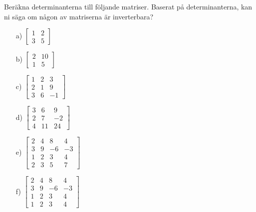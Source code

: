Beräkna determinanterna till följande matriser. Baserat på determinanterna, kan ni säga om någon av matriserna är inverterbara?
\begin{itemize}
	\item[a) ] $\begin{bmatrix}1 & 2 \\ 3 & 5\end{bmatrix}$
	\item[b) ] $\begin{bmatrix}2 & 10 \\ 1 & 5\end{bmatrix}$
	\item[c) ] $\begin{bmatrix}1 & 2 & 3\\ 2 & 1 & 9 \\ 3 & 6 & -1\end{bmatrix}$
	\item[d) ] $\begin{bmatrix}3 & 6 & 9\\ 2 & 7 & -2 \\ 4 & 11 & 24\end{bmatrix}$
	\item[e) ] $\begin{bmatrix} 2 & 4 & 8 & 4\\ 3 & 9 & -6 & -3 \\ 1 & 2 & 3 & 4 \\ 2 & 3 & 5 & 7 \end{bmatrix}$
	\item[f) ] $\begin{bmatrix} 2 & 4 & 8 & 4\\ 3 & 9 & -6 & -3 \\ 1 & 2 & 3 & 4 \\ 1 & 2 & 3 & 4 \end{bmatrix}$
\end{itemize}